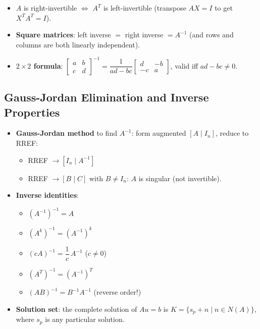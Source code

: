 \documentclass[hidelinks]{article}
\begin{document}
\begin{itemize}
\begin{itemize}
    \end{itemize}
    \item $A$ is right-invertible $\iff$ $A^T$ is left-invertible (transpose $AX=I$ to get $X^TA^T=I$).
    \item \textbf{Square matrices}: left inverse $=$ right inverse $= A^{-1}$ (and rows and columns are both linearly independent).
    \item \textbf{$2\times 2$ formula}: $\begin{bmatrix}a&b\\c&d\end{bmatrix}^{-1} = \dfrac{1}{ad-bc}\begin{bmatrix}d&-b\\-c&a\end{bmatrix}$, valid iff $ad-bc\neq 0$.
\end{itemize}

\subsection{Gauss-Jordan Elimination and Inverse Properties}
\begin{itemize}
    \item \textbf{Gauss-Jordan method} to find $A^{-1}$: form augmented $[A \mid I_n]$, reduce to RREF:
    \begin{itemize}
        \item RREF $\rightarrow [I_n \mid A^{-1}]$ \checkmark
        \item RREF $\rightarrow [B \mid C]$ with $B \neq I_n$: $A$ is singular (not invertible).
    \end{itemize}
    \item \textbf{Inverse identities}:
    \begin{itemize}
        \item $(A^{-1})^{-1} = A$
        \item $(A^k)^{-1} = (A^{-1})^k$
        \item $(cA)^{-1} = \dfrac{1}{c}\,A^{-1}$ \quad ($c\neq 0$)
        \item $(A^T)^{-1} = (A^{-1})^T$
        \item $(AB)^{-1} = B^{-1}A^{-1}$ \quad (reverse order!)
    \end{itemize}
    \item \textbf{Solution set}: the complete solution of $Au=b$ is $K = \{s_p + n \mid n \in N(A)\}$, where $s_p$ is any particular solution.
\end{itemize}
\end{document}

